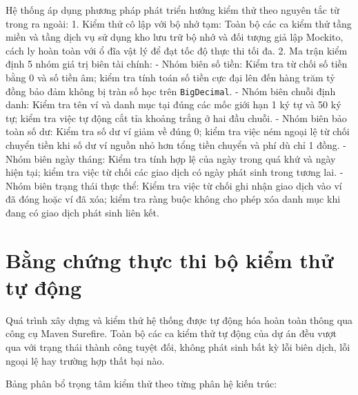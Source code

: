\documentclass[a4paper,12pt]{report}
\newcommand{\passthrough}[1]{#1}
\begin{document}
Hệ thống áp dụng phương pháp phát triển hướng kiểm thử theo nguyên tắc
từ trong ra ngoài: 1. Kiểm thử cô lập với bộ nhớ tạm: Toàn bộ các ca
kiểm thử tầng miền và tầng dịch vụ sử dụng kho lưu trữ bộ nhớ và đối
tượng giả lập Mockito, cách ly hoàn toàn với ổ đĩa vật lý để đạt tốc độ
thực thi tối đa. 2. Ma trận kiểm định 5 nhóm giá trị biên tài chính: -
Nhóm biên số tiền: Kiểm tra từ chối số tiền bằng 0 và số tiền âm; kiểm
tra tính toán số tiền cực đại lên đến hàng trăm tỷ đồng bảo đảm không bị
tràn số học trên \passthrough{\lstinline!BigDecimal!}. - Nhóm biên chuỗi
định danh: Kiểm tra tên ví và danh mục tại đúng các mốc giới hạn 1 ký tự
và 50 ký tự; kiểm tra việc tự động cắt tỉa khoảng trắng ở hai đầu chuỗi.
- Nhóm biên bảo toàn số dư: Kiểm tra số dư ví giảm về đúng 0; kiểm tra
việc ném ngoại lệ từ chối chuyển tiền khi số dư ví nguồn nhỏ hơn tổng
tiền chuyển và phí dù chỉ 1 đồng. - Nhóm biên ngày tháng: Kiểm tra tính
hợp lệ của ngày trong quá khứ và ngày hiện tại; kiểm tra việc từ chối
các giao dịch có ngày phát sinh trong tương lai. - Nhóm biên trạng thái
thực thể: Kiểm tra việc từ chối ghi nhận giao dịch vào ví đã đóng hoặc
ví đã xóa; kiểm tra ràng buộc không cho phép xóa danh mục khi đang có
giao dịch phát sinh liên kết.

\section{Bằng chứng thực thi bộ kiểm thử tự
động}\label{bux1eb1ng-chux1ee9ng-thux1ef1c-thi-bux1ed9-kiux1ec3m-thux1eed-tux1ef1-ux111ux1ed9ng}

Quá trình xây dựng và kiểm thử hệ thống được tự động hóa hoàn toàn thông
qua công cụ Maven Surefire. Toàn bộ các ca kiểm thử tự động của dự án
đều vượt qua với trạng thái thành công tuyệt đối, không phát sinh bất kỳ
lỗi biên dịch, lỗi ngoại lệ hay trường hợp thất bại nào.

Bảng phân bổ trọng tâm kiểm thử theo từng phân hệ kiến trúc:
\end{document}
